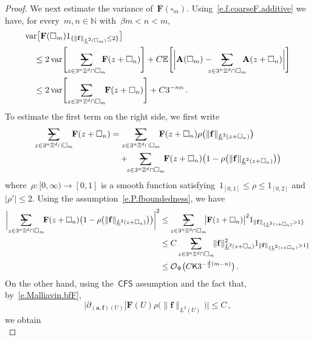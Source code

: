 \documentclass[11pt]{article} %
\makeatletter
\let\oldsquare\square %
\renewcommand{\square}{\oldsquare}
\numberwithin{equation}{section}
\theoremstyle{definition}
\newcommand*{\N}{\ensuremath{\mathbb{N}}}
\newcommand*{\Z}{\ensuremath{\mathbb{Z}}}
\newcommand{\f}{\mathbf{f}}
\renewcommand{\a}{\mathbf{a}}
\newcommand{\cu}{\square}
\newcommand{\E}{\mathbb{E}}
\renewcommand{\O}{\mathcal{O}}
\newcommand{\indc}{1}
\DeclareMathOperator{\var}{var}
\newcommand{\avsum}{\mathop{\mathpalette\avsuminner\relax}\displaylimits}
\newcommand\avsuminner[2]{%
  {\sbox0{$\m@th#1\sum$}%
   \vphantom{\usebox0}%
   \ooalign{%
     \hidewidth
     \smash{\,\rule[.23em]{8.8pt}{1.1pt} \relax}%
     \hidewidth\cr
     $\m@th#1\sum$\cr
   }%
  }%
}
\newcommand{\CFS}{\mathsf{CFS}}
\newcommand{\bfA}{\mathbf{A}}
\newcommand{\bfF}{\mathbf{F}}
\makeatother
\begin{document}
\begin{proof}
\smallskip

We next estimate the variance of~$\bfF(\cu_m)$. Using~\eqref{e.f.coarseF.additive} we have, for every~$m,n\in\N$ with~$\beta m < n < m$,  
\begin{align*} \notag  
\lefteqn{
\var \bigl[ \bfF(\cu_m) \indc_{\{ \| \f \|_{\underline{L}^2(\cu_m)} \leq 2 \}} \bigr] 
} \quad &
\\ 
 &
\leq
2\var \Biggl[ \avsum_{z \in 3^n \Z^d \cap \cu_m} \!\!\!\!  \bfF(z+\cu_n)  \Biggr]
+
C
\E \Biggl[ \biggl|  \bfA(\cu_m) - \!\!\!\! \avsum_{z \in 3^n \Z^d \cap \cu_m} \!\!\!\! \bfA(z+\cu_n)  \biggr| 
\Biggr]
\notag \\ & 
\leq 
2\var \Biggl[ \avsum_{z \in 3^n \Z^d \cap \cu_m} \!\!  \bfF(z+\cu_n)  \Biggr]
+
C 3^{-n\alpha} 
\,.
\end{align*}
To estimate the first term on the right side, we first write
\begin{align*}
\avsum_{z \in 3^n \Z^d \cap \cu_m} \!\!  \bfF(z+\cu_n) 
& 
=
\avsum_{z \in 3^n \Z^d \cap \cu_m} \!\!  \bfF(z+\cu_n)  \rho\bigl( \| \f \|_{\underline{L}^2(z+\cu_n)} \bigr)
\\ & \quad 
+ \!\!
\avsum_{z \in 3^n \Z^d \cap \cu_m} \!\!  \bfF(z+\cu_n) \bigl( 1 -  \rho\bigl( \| \f \|_{\underline{L}^2(z+\cu_n)} \bigr) \bigr) 
\end{align*}
where~$\rho : [0,\infty) \to [0,1]$ is a smooth function satisfying~$\indc_{[0, 1]} \leq \rho \leq \indc_{[0,2]}$ and~$| \rho' | \leq 2$. 
Using the assumption~\eqref{e.P.fboundedness}, we have 
\begin{align*}
\biggl| \avsum_{z \in 3^n \Z^d \cap \cu_m} \!\!  \bfF(z+\cu_n) \bigl( 1 -  \rho\bigl( \| \f \|_{\underline{L}^2(z+\cu_n)} \bigr) \bigr) \biggl|^2 
&
\leq 
\avsum_{z \in 3^n \Z^d \cap \cu_m} \!\!  \bigl|  \bfF(z+\cu_n)\bigr|^2 \indc_{\| \f \|_{\{ \underline{L}^2(z+\cu_n)}>1\}} 
\\ & 
\leq 
C \avsum_{z \in 3^n \Z^d \cap \cu_m} \!\!  \| \f \|_{\underline{L}^2(z+\cu_n)}^2 \indc_{\| \f \|_{\{ \underline{L}^2(z+\cu_n)}>1\}} 
\\ & 
\leq 
\O_\Psi \bigl( C \mathsf{K} 3^{-\frac d2 (m-n)} \bigr) \,.
\end{align*}
On the other hand, using the~$\CFS$ assumption and the fact that, by~\eqref{e.Malliavin.bfF}, 
\begin{equation*}
\bigl| \partial_{(\a,\f)(U)} \bigl[ \bfF(U) \rho\bigl( \| \f \|_{\underline{L}^2(U)} \bigr)  \bigr| 
\leq 
C\,,
\end{equation*}
we obtain 
\begin{equation*}

\end{equation*}
\end{proof}
\end{document}
